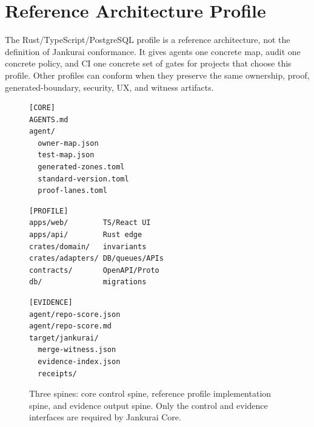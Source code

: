 \section{Reference Architecture Profile}

The Rust/TypeScript/PostgreSQL profile is a reference architecture, not the definition of Jankurai conformance. It gives agents one concrete map, audit one concrete policy, and CI one concrete set of gates for projects that choose this profile. Other profiles can conform when they preserve the same ownership, proof, generated-boundary, security, UX, and witness artifacts.

\begin{figure}[t]
\centering
\begin{minipage}[t]{0.31\textwidth}
\begin{lstlisting}[style=codebox]
[CORE]
AGENTS.md
agent/
  owner-map.json
  test-map.json
  generated-zones.toml
  standard-version.toml
  proof-lanes.toml
\end{lstlisting}
\end{minipage}
\hfill
\begin{minipage}[t]{0.31\textwidth}
\begin{lstlisting}[style=codebox]
[PROFILE]
apps/web/        TS/React UI
apps/api/        Rust edge
crates/domain/   invariants
crates/adapters/ DB/queues/APIs
contracts/       OpenAPI/Proto
db/              migrations
\end{lstlisting}
\end{minipage}
\hfill
\begin{minipage}[t]{0.31\textwidth}
\begin{lstlisting}[style=codebox]
[EVIDENCE]
agent/repo-score.json
agent/repo-score.md
target/jankurai/
  merge-witness.json
  evidence-index.json
  receipts/
\end{lstlisting}
\end{minipage}
\caption{Three spines: core control spine, reference profile implementation spine, and evidence output spine. Only the control and evidence interfaces are required by Jankurai Core.}
\label{fig:repo-tree-main}
\end{figure}

